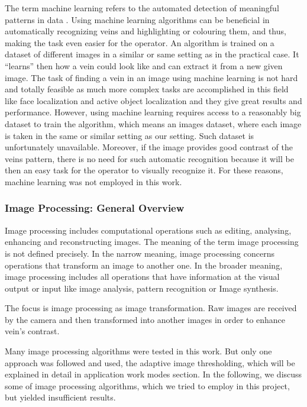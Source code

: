 The term machine learning refers to the automated detection of meaningful patterns in data \parencite{machineLearning}.
Using machine learning algorithms can be beneficial in automatically recognizing veins and highlighting or colouring them, and thus, making the task even easier for the operator. An algorithm is trained on a dataset of different images in a similar or same setting as in the practical case. It “learns” then how a vein could look like and can extract it from a new given image. The task of finding a vein in an image using machine learning is not hard and totally feasible as much more complex tasks are accomplished in this field like face localization \parencite{faceLocal} and active object localization \parencite{objectLocal} and they give great results and performance. However, using machine learning requires access to a reasonably big dataset to train the algorithm, which means an images dataset, where each image is taken in the same or similar setting as our setting. Such dataset is unfortunately unavailable.
Moreover, if the image provides good contrast of the veins pattern, there is no need for such automatic recognition because it will be then an easy task for the operator to visually recognize it. For these reasons, machine learning was not employed in this work.


\subsubsection{Image Processing: General Overview}

Image processing includes computational operations such as editing, analysing, enhancing and reconstructing images. 
The meaning of the term image processing is not defined precisely. In the narrow meaning, image processing concerns operations that transform an image to another one. In the broader meaning, image processing includes all operations that have information at the visual output or input like image analysis, pattern recognition or Image synthesis. 

The focus is image processing as image transformation. Raw images are received by the camera and then transformed into another images in order to enhance vein’s contrast. 

Many image processing algorithms were tested in this work. But only one approach was followed and used, the adaptive image thresholding, which will be explained in detail in application work modes section. 
In the following, we discuss some of image processing algorithms, which we tried to employ in this project, but yielded insufficient results.

